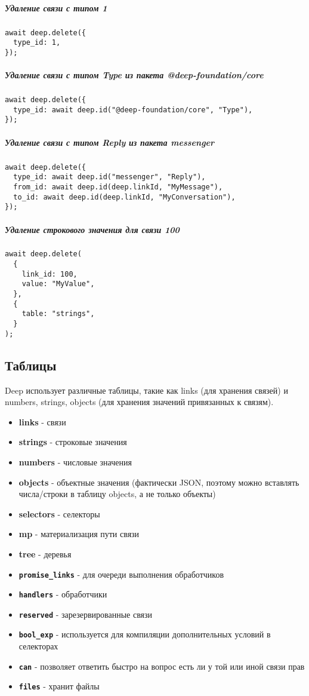 \documentclass{article}
\begin{document}
\subparagraph{Удаление связи с типом 1}
\begin{lstlisting}
await deep.delete({
  type_id: 1,
});
\end{lstlisting}

\subparagraph{Удаление связи с типом Type из пакета @deep-foundation/core}
\begin{lstlisting}
await deep.delete({
  type_id: await deep.id("@deep-foundation/core", "Type"),
});
\end{lstlisting}

\subparagraph{Удаление связи с типом Reply из пакета messenger}
\begin{lstlisting}
await deep.delete({
  type_id: await deep.id("messenger", "Reply"),
  from_id: await deep.id(deep.linkId, "MyMessage"),
  to_id: await deep.id(deep.linkId, "MyConversation"),
});
\end{lstlisting}

\subparagraph{Удаление строкового значения для связи 100}
\begin{lstlisting}
await deep.delete(
  {
    link_id: 100,
    value: "MyValue",
  },
  {
    table: "strings",
  }
);
\end{lstlisting}

\subsection{Таблицы}
Deep использует различные таблицы, такие как links (для хранения связей) и numbers, strings, objects (для хранения значений привязанных к связям).


\begin{itemize}
  \item \textbf{links} - связи
  \item \textbf{strings} - строковые значения
  \item \textbf{numbers} - числовые значения
  \item \textbf{objects} - объектные значения (фактически JSON, поэтому можно
        вставлять числа/строки в таблицу objects, а не только объекты)
  \item \textbf{selectors} - селекторы
  \item \textbf{mp} - материализация пути связи
  \item \textbf{tree} - деревья
  \item \textbf{\texttt{promise\_links}} - для очереди выполнения обработчиков
  \item \textbf{\texttt{handlers}} - обработчики
  \item \textbf{\texttt{reserved}} - зарезервированные связи
  \item \textbf{\texttt{bool\_exp}} - используется для компиляции дополнительных условий в селекторах
  \item \textbf{\texttt{can}} - позволяет ответить быстро на вопрос есть ли у той или иной связи прав
  \item \textbf{\texttt{files}} - хранит файлы
\end{itemize}
\end{document}
